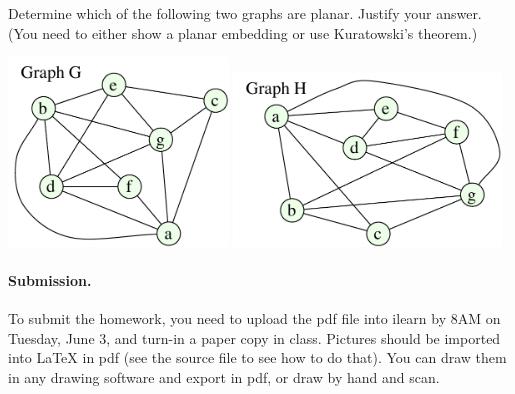 \documentclass{article}
\begin{document}
\begin{problem}
Determine which of the following two graphs are planar.
Justify your answer. (You need to either show a planar embedding or
use Kuratowski's theorem.)

	\begin{center}
		\includegraphics[width = 2.3in]{graphGa_hw5.pdf}
		\hfill
		\includegraphics[width = 2.8in]{graphHa_hw5.pdf}
	\end{center}

\end{problem}







\vskip 0.1in
\paragraph{Submission.}
To submit the homework, you need to upload the pdf file into ilearn by 8AM on Tuesday, June 3,
and turn-in a paper copy in class.
Pictures should be 
imported into {\LaTeX} in pdf (see the source file to see
how to do that). You can draw them in any drawing
software and export in pdf, or draw by hand and scan.
\end{document}
